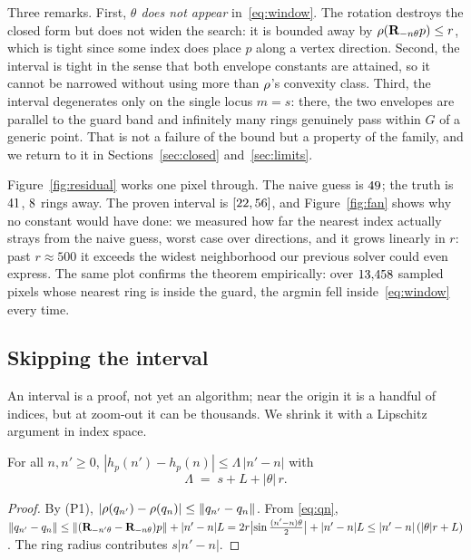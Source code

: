 Three remarks. First, \emph{$\theta$ does not appear} in~\eqref{eq:window}. The
rotation destroys the closed form but does not widen the search: it is bounded
away by $\rho(\mathbf{R}_{-n\theta}p)\le r$, which is tight since some index does place
$p$ along a vertex direction. Second, the interval is tight in the sense that both
envelope constants are attained, so it cannot be narrowed without using more than
$\rho$'s convexity class. Third, the interval degenerates only on the single locus
$m=s$: there, the two envelopes are parallel to the guard band and infinitely many
rings genuinely pass within $G$ of a generic point. That is not a failure of the
bound but a property of the family, and we return to it in
Sections~\ref{sec:closed} and~\ref{sec:limits}.

Figure~\ref{fig:residual} works one pixel through. The naive guess is $49$;
the truth is $41$, $8$ rings away. The proven interval is
$[22,56]$, and Figure~\ref{fig:fan} shows why no constant would have done:
we measured how far the nearest index actually strays from the naive guess, worst
case over directions, and it grows linearly in $r$: past $r\approx500$ it
exceeds the widest neighborhood our previous solver could even express. The same
plot confirms the theorem empirically: over $13{,}458$ sampled pixels whose
nearest ring is inside the guard, the argmin fell inside~\eqref{eq:window} every
time.

\subsection{Skipping the interval}
\label{sec:skip}

An interval is a proof, not yet an algorithm; near the origin it is a handful of
indices, but at zoom-out it can be thousands. We shrink it with a Lipschitz
argument in index space.

\begin{lemma}
\label{lem:lipschitz}
For all $n, n'\ge 0$,
$|h_p(n')-h_p(n)| \le \Lambda\,|n'-n|$ with
\begin{equation}
  \Lambda \;=\; s + L + |\theta|\,r .
  \label{eq:lambda}
\end{equation}
\end{lemma}

\begin{proof}
By (P1), $|\rho(q_{n'})-\rho(q_n)| \le \lVert q_{n'}-q_n\rVert$. From
\eqref{eq:qn}, $\lVert q_{n'}-q_n\rVert \le
\lVert(\mathbf{R}_{-n'\theta}-\mathbf{R}_{-n\theta})p\rVert + |n'-n|L
= 2r\bigl|\sin\tfrac{(n'-n)\theta}{2}\bigr| + |n'-n|L
\le |n'-n|\,(|\theta| r + L)$. The ring radius contributes $s|n'-n|$.
\end{proof}

